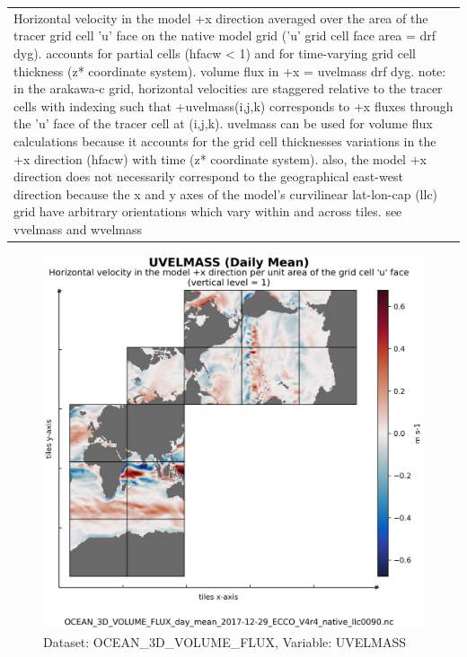 \begin{longtable}{|m{}|m{}|m{}|m{}|}
\rowcolor{lightgray} \multicolumn{4}{|c|}{\textbf{Comments}} \\ \hline
\multicolumn{4}{|p{1\textwidth}|}{\footnotesize{{Horizontal velocity in the model +x direction averaged over the area of the tracer grid cell 'u' face on the native model grid ('u' grid cell face area = drf dyg). accounts for partial cells (hfacw < 1) and for time-varying grid cell thickness (z* coordinate system). volume flux in +x = uvelmass drf dyg. note: in the arakawa-c grid, horizontal velocities are staggered relative to the tracer cells with indexing such that +uvelmass(i,j,k) corresponds to +x fluxes through the 'u' face of the tracer cell at (i,j,k). uvelmass can be used for volume flux calculations because it accounts for the grid cell thicknesses variations in the +x direction (hfacw) with time (z* coordinate system). also, the model +x direction does not necessarily correspond to the geographical east-west direction because the x and y axes of the model's curvilinear lat-lon-cap (llc) grid have arbitrary orientations which vary within and across tiles. see vvelmass and wvelmass}}} \\ \hline
\end{longtable}

\begin{figure}[H]
\centering
\includegraphics[scale=0.55]{../images/plots/native_plots/Ocean_Three-Dimensional_Volume_Fluxes/UVELMASS.png}
\caption{Dataset: OCEAN\_3D\_VOLUME\_FLUX, Variable: UVELMASS}
\label{tab:table-OCEAN_3D_VOLUME_FLUX_UVELMASS-Plot}
\end{figure}
\newpage
\pagebreak
